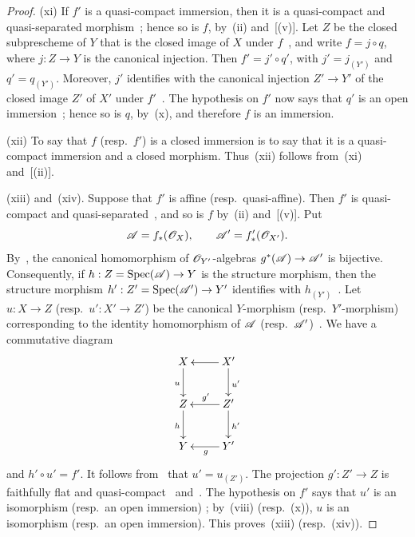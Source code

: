 \begin{proof}

\textnormal{(xi)} If $f'$ is a quasi-compact immersion, then it is a
quasi-compact and quasi-separated morphism~; hence so
is $f$, by~\textnormal{(ii)} and~[(v)]. Let $Z$ be the
closed subprescheme of $Y$ that is the closed image of $X$ under
$f$~, and write $f=j\circ q$, where $j:Z\to Y$ is the
canonical injection. Then $f'=j'\circ q'$, with
$j'=j_{(Y')}$ and $q'=q_{(Y')}$. Moreover, $j'$ identifies with the
canonical injection $Z'\to Y'$ of the closed image $Z'$ of $X'$ under
$f'$~. The hypothesis on $f'$ now says that $q'$ is an
open immersion~; hence so is $q$,
by~\textnormal{(x)}, and therefore $f$ is an immersion.

\textnormal{(xii)} To say that $f$ \textnormal{(}resp.\ $f'$\textnormal{)}
is a closed immersion is to say that it is a quasi-compact immersion
and a closed morphism. Thus~\textnormal{(xii)} follows
from~\textnormal{(xi)} and~[(ii)].

\textnormal{(xiii)} and~\textnormal{(xiv)}. Suppose that $f'$ is affine
\textnormal{(}resp.\ quasi-affine\textnormal{)}. Then $f'$ is
quasi-compact and quasi-separated~, and so is $f$
by~\textnormal{(ii)} and~[(v)]. Put
\[
  \mathscr{A}=f_*(\mathscr{O}_X),\qquad
  \mathscr{A}'=f'_*(\mathscr{O}_{X'}).
\]
By~, the canonical homomorphism of
$\mathscr{O}_{Y'}$-algebras $g^*(\mathscr{A})\to\mathscr{A}'$ is bijective.
Consequently, if $h:Z=\operatorname{Spec}(\mathscr{A})\to Y$ is the structure morphism,
then the structure morphism $h':Z'=\operatorname{Spec}(\mathscr{A}')\to Y'$ identifies
with $h_{(Y')}$~. Let $u:X\to Z$
\textnormal{(}resp.\ $u':X'\to Z'$\textnormal{)} be the canonical
$Y$-morphism \textnormal{(}resp.\ $Y'$-morphism\textnormal{)}
corresponding to the identity homomorphism of $\mathscr{A}$
\textnormal{(}resp.\ $\mathscr{A}'$\textnormal{)}~.
We have a commutative diagram
\[
\xymatrix{
  X \ar[d]_u & X' \ar[l] \ar[d]^{u'} \\
  Z \ar[d]_h & Z' \ar[l]_{g'} \ar[d]^{h'} \\
  Y & Y' \ar[l]^g
}
\]
and $h'\circ u'=f'$. It follows from~ that
$u'=u_{(Z')}$. The projection $g':Z'\to Z$ is faithfully flat and
quasi-compact~ and~. The hypothesis on
$f'$ says that $u'$ is an isomorphism
\textnormal{(}resp.\ an open immersion\textnormal{)}
; by~\textnormal{(viii)}
\textnormal{(}resp.\ (x)\textnormal{)}, $u$ is an
isomorphism \textnormal{(}resp.\ an open immersion\textnormal{)}. This
proves~\textnormal{(xiii)} \textnormal{(}resp.\
\textnormal{(xiv)}\textnormal{)}.


\end{proof}
